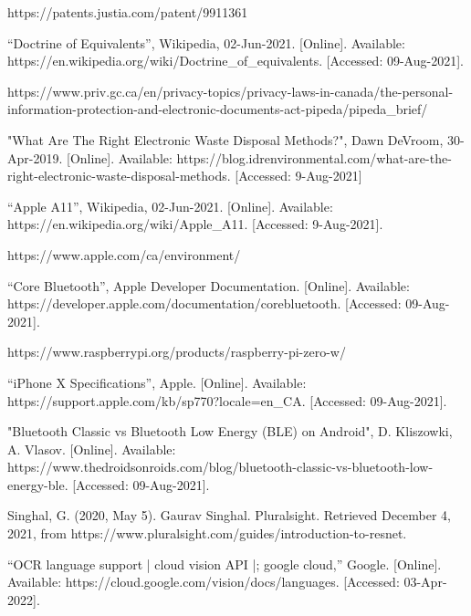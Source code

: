 \documentclass[a4paper,11pt]{article}
\begin{document}
\begin{thebibliography}{9}
https://patents.justia.com/patent/9911361

“Doctrine of Equivalents”, Wikipedia, 02-Jun-2021. [Online]. Available: https://en.wikipedia.org/wiki/Doctrine\_of\_equivalents. [Accessed: 09-Aug-2021].

https://www.priv.gc.ca/en/privacy-topics/privacy-laws-in-canada/the-personal-information-protection-and-electronic-documents-act-pipeda/pipeda\_brief/

"What Are The Right Electronic Waste Disposal Methods?", Dawn DeVroom, 30-Apr-2019. [Online]. Available: https://blog.idrenvironmental.com/what-are-the-right-electronic-waste-disposal-methods. [Accessed: 9-Aug-2021]

“Apple A11”, Wikipedia, 02-Jun-2021. [Online]. Available:
https://en.wikipedia.org/wiki/Apple\_A11. [Accessed: 9-Aug-2021].

https://www.apple.com/ca/environment/

“Core Bluetooth”, Apple Developer Documentation. [Online]. Available: https://developer.apple.com/documentation/corebluetooth. [Accessed: 09-Aug-2021]. 

https://www.raspberrypi.org/products/raspberry-pi-zero-w/

“iPhone X Specifications”, Apple. [Online]. Available: https://support.apple.com/kb/sp770?locale=en\_CA. [Accessed: 09-Aug-2021]. 

"Bluetooth Classic vs Bluetooth Low Energy (BLE) on Android", D. Kliszowki, A. Vlasov. [Online]. Available: https://www.thedroidsonroids.com/blog/bluetooth-classic-vs-bluetooth-low-energy-ble. [Accessed: 09-Aug-2021].

Singhal, G. (2020, May 5). Gaurav Singhal. Pluralsight. Retrieved December 4, 2021, from https://www.pluralsight.com/guides/introduction-to-resnet.

“OCR language support | cloud vision API |; google cloud,” Google. [Online]. Available: https://cloud.google.com/vision/docs/languages. [Accessed: 03-Apr-2022]. 

\end{thebibliography}
\end{document}
